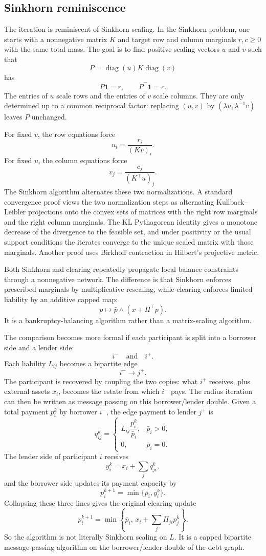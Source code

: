 \documentclass[11pt,oneside]{article}
\newcommand{\barp}{\bar p}
\begin{document}
\subsection{Sinkhorn reminiscence}
The iteration is reminiscent of Sinkhorn scaling. In the Sinkhorn problem, one
starts with a nonnegative matrix $K$ and target row and column marginals
$r,c\geq0$ with the same total mass. The goal is to find positive scaling
vectors $u$ and $v$ such that
\[
  P=\operatorname{diag}(u)K\operatorname{diag}(v)
\]
has
\[
  P\mathbf{1}=r,\qquad P^\top\mathbf{1}=c.
\]
The entries of $u$ scale rows and the entries of $v$ scale columns. They are
only determined up to a common reciprocal factor: replacing $(u,v)$ by
$(\lambda u,\lambda^{-1}v)$ leaves $P$ unchanged.

For fixed $v$, the row equations force
\[
  u_i=\frac{r_i}{(Kv)_i}.
\]
For fixed $u$, the column equations force
\[
  v_j=\frac{c_j}{(K^\top u)_j}.
\]
The Sinkhorn algorithm alternates these two normalizations. A standard
convergence proof views the two normalization steps as alternating
Kullback--Leibler projections onto the convex sets of matrices with the right
row marginals and the right column marginals. The KL Pythagorean identity gives
a monotone decrease of the divergence to the feasible set, and under positivity
or the usual support conditions the iterates converge to the unique scaled
matrix with those marginals. Another proof uses Birkhoff contraction in
Hilbert's projective metric.

Both Sinkhorn and clearing repeatedly propagate local balance constraints
through a nonnegative network. The difference is that Sinkhorn enforces
prescribed marginals by multiplicative rescaling, while clearing enforces
limited liability by an additive capped map:
\[
  p\mapsto \barp\wedge(x+\Pi^\top p).
\]
It is a bankruptcy-balancing algorithm rather than a matrix-scaling algorithm.

The comparison becomes more formal if each participant is split into a borrower
side and a lender side:
\[
  i^- \quad\text{and}\quad i^+.
\]
Each liability $L_{ij}$ becomes a bipartite edge
\[
  i^-\longrightarrow j^+.
\]
The participant is recovered by coupling the two copies: what $i^+$ receives,
plus external assets $x_i$, becomes the estate from which $i^-$ pays. The
radius iteration can then be written as message passing on this borrower/lender
double. Given a total payment $p_i^k$ by borrower $i^-$, the edge payment to
lender $j^+$ is
\[
  q_{ij}^k=
  \begin{cases}
    L_{ij}\dfrac{p_i^k}{\barp_i}, & \barp_i>0,\\
    0, & \barp_i=0.
  \end{cases}
\]
The lender side of participant $i$ receives
\[
  y_i^k=x_i+\sum_j q_{ji}^k,
\]
and the borrower side updates its payment capacity by
\[
  p_i^{k+1}=\min\{\barp_i,y_i^k\}.
\]
Collapsing these three lines gives the original clearing update
\[
  p_i^{k+1}
  =
  \min\left\{
    \barp_i,\,
    x_i+\sum_j\Pi_{ji}p_j^k
  \right\}.
\]
So the algorithm is not literally Sinkhorn scaling on $L$. It is a capped
bipartite message-passing algorithm on the borrower/lender double of the debt
graph.
\end{document}
